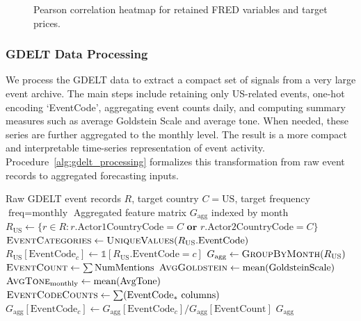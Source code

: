 \documentclass[pdflatex,sn-mathphys-num]{sn-jnl}%
\theoremstyle{thmstyleone}%
\theoremstyle{thmstyletwo}%
\theoremstyle{thmstylethree}%
\begin{document}
\begin{figure}[t]
\centering

\caption{Pearson correlation heatmap for retained FRED variables and target prices.}
\label{fig:macro_correlation_heatmap}
\end{figure}


\subsubsection{GDELT Data Processing}\label{subsubsec:gdeltprocessing}

We process the GDELT data to extract a compact set of signals from a very large event archive. The main steps include retaining only US-related events, one-hot encoding `EventCode', aggregating event counts daily, and computing summary measures such as average Goldstein Scale and average tone. When needed, these series are further aggregated to the monthly level. The result is a more compact and interpretable time-series representation of event activity. Procedure~\ref{alg:gdelt_processing} formalizes this transformation from raw event records to aggregated forecasting inputs.

\begin{algorithm}[H]
\caption{GDELT Data Processing and Feature Extraction}
\label{alg:gdelt_processing}
\begin{algorithmic}[1]
\Require Raw GDELT event records $R$, target country $C=\text{US}$, target frequency $\text{freq}=\text{monthly}$
\Ensure Aggregated feature matrix $G_{\text{agg}}$ indexed by month
\State $R_{\text{US}} \gets \{r \in R : r.\text{Actor1CountryCode}=C \textbf{ or } r.\text{Actor2CountryCode}=C\}$
\State $\textsc{EventCategories} \gets \textsc{UniqueValues}(R_{\text{US}}.\text{EventCode})$
    \State $R_{\text{US}}[\text{EventCode}_{c}] \gets \mathbb{1}[R_{\text{US}}.\text{EventCode} = c]$
\EndFor
\State $G_{\text{agg}} \gets \textsc{GroupByMonth}(R_{\text{US}})$
\Statex \hspace{1.5em}$\textsc{EventCount} \gets \sum \text{NumMentions}$
\Statex \hspace{1.5em}$\textsc{AvgGoldstein} \gets \text{mean}(\text{GoldsteinScale})$
\Statex \hspace{1.5em}$\textsc{AvgTone}_{\text{monthly}} \gets \text{mean}(\text{AvgTone})$
\Statex \hspace{1.5em}$\textsc{EventCodeCounts} \gets \sum (\text{EventCode}_{\ast}\text{ columns})$
    \State $G_{\text{agg}}[\text{EventCode}_{c}] \gets G_{\text{agg}}[\text{EventCode}_{c}] / G_{\text{agg}}[\text{EventCount}]$
\EndFor
\State \Return $G_{\text{agg}}$
\end{algorithmic}
\end{algorithm}
\end{document}
